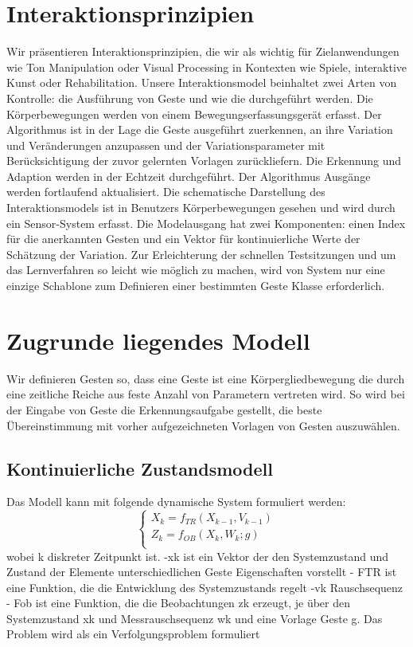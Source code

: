 \documentclass{llncs}
\begin{document}
\section{Interaktionsprinzipien}
Wir präsentieren Interaktionsprinzipien, die wir als wichtig für Zielanwendungen wie Ton Manipulation oder Visual Processing in Kontexten wie Spiele, interaktive Kunst oder Rehabilitation. Unsere Interaktionsmodel beinhaltet zwei Arten von Kontrolle: die Ausführung von Geste und wie die durchgeführt werden. Die Körperbewegungen werden von einem Bewegungserfassungsgerät erfasst. Der Algorithmus ist in der Lage die Geste ausgeführt zuerkennen, an ihre  Variation und Veränderungen anzupassen und der Variationsparameter mit Berücksichtigung der zuvor gelernten Vorlagen zurückliefern. Die Erkennung und Adaption werden in der Echtzeit durchgeführt. Der Algorithmus Ausgänge werden fortlaufend aktualisiert. Die schematische Darstellung des Interaktionsmodels ist in Benutzers Körperbewegungen gesehen und wird durch ein Sensor-System erfasst. Die Modelausgang hat zwei Komponenten:  einen Index für die anerkannten Gesten und ein Vektor für kontinuierliche Werte der Schätzung der Variation. Zur Erleichterung der schnellen Testsitzungen und um das Lernverfahren so leicht wie möglich zu machen, wird von System nur eine einzige Schablone zum Definieren einer bestimmten Geste Klasse erforderlich.

\section{Zugrunde liegendes Modell}
Wir definieren Gesten so, dass eine Geste ist eine Körpergliedbewegung die durch eine zeitliche Reiche aus feste Anzahl von Parametern vertreten wird. So wird bei der Eingabe von Geste die Erkennungsaufgabe gestellt, die beste Übereinstimmung mit vorher aufgezeichneten Vorlagen von Gesten auszuwählen.
\subsection{ Kontinuierliche Zustandsmodell}
Das Modell kann mit folgende dynamische System formuliert werden:
\begin{equation}
\left\{\begin{array}{l}
X_k = f_{TR} (X_{k-1}, V_{k-1}) \\
Z_k = f_{OB} (X_k, W_k; g) \\
\end{array}\right.
\end{equation} 										
wobei k diskreter Zeitpunkt ist.
-xk ist ein Vektor der den Systemzustand und Zustand der Elemente unterschiedlichen Geste Eigenschaften vorstellt
-   FTR ist eine Funktion, die die Entwicklung des Systemzustands regelt
-vk Rauschsequenz
- Fob ist eine Funktion, die die Beobachtungen zk erzeugt, je über den Systemzustand xk und Messrauschsequenz wk und eine Vorlage Geste g.
Das Problem wird als ein Verfolgungsproblem formuliert
\end{document}
